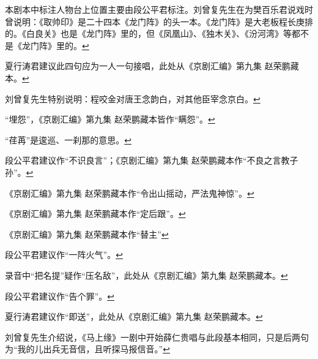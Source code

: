 \item
  \leavevmode\hypertarget{fn337}{}%
  本剧本中标注人物台上位置主要由段公平君标注。刘曾复先生在为樊百乐君说戏时曾说明：《取帅印》是二十四本《龙门阵》的头一本。《龙门阵》是大老板程长庚排的。《白良关》也是《龙门阵》里的，但《凤凰山》、《独木关》、《汾河湾》等都不是《龙门阵》里的。\protect\hyperlink{fnref337}{↩}
\item
  \leavevmode\hypertarget{fn338}{}%
  夏行涛君建议此四句应为一人一句接唱，此处从《京剧汇编》第九集
  赵荣鹏藏本。\protect\hyperlink{fnref338}{↩}
\item
  \leavevmode\hypertarget{fn339}{}%
  刘曾复先生特别说明：程咬金对唐王念韵白，对其他臣宰念京白。\protect\hyperlink{fnref339}{↩}
\item
  \leavevmode\hypertarget{fn340}{}%
  ``埋怨''，《京剧汇编》第九集
  赵荣鹏藏本皆作``瞒怨''。\protect\hyperlink{fnref340}{↩}
\item
  \leavevmode\hypertarget{fn341}{}%
  ``荏苒''是逡巡、一刹那的意思。\protect\hyperlink{fnref341}{↩}
\item
  \leavevmode\hypertarget{fn342}{}%
  段公平君建议作``不识良言''；《京剧汇编》第九集
  赵荣鹏藏本作``不良之言教子孙''。\protect\hyperlink{fnref342}{↩}
\item
  \leavevmode\hypertarget{fn343}{}%
  《京剧汇编》第九集
  赵荣鹏藏本作``令出山摇动，严法鬼神惊''。\protect\hyperlink{fnref343}{↩}
\item
  \leavevmode\hypertarget{fn344}{}%
  《京剧汇编》第九集
  赵荣鹏藏本作``定后跟''。\protect\hyperlink{fnref344}{↩}
\item
  \leavevmode\hypertarget{fn345}{}%
  《京剧汇编》第九集 赵荣鹏藏本作``替主''\protect\hyperlink{fnref345}{↩}
\item
  \leavevmode\hypertarget{fn346}{}%
  段公平君建议作``一阵火气''。\protect\hyperlink{fnref346}{↩}
\item
  \leavevmode\hypertarget{fn347}{}%
  录音中``把名提''疑作``压名敌''，此处从《京剧汇编》第九集
  赵荣鹏藏本。\protect\hyperlink{fnref347}{↩}
\item
  \leavevmode\hypertarget{fn348}{}%
  段公平君建议作``告个罪''。\protect\hyperlink{fnref348}{↩}
\item
  \leavevmode\hypertarget{fn349}{}%
  夏行涛君建议作``即送''，此处从《京剧汇编》第九集
  赵荣鹏藏本。\protect\hyperlink{fnref349}{↩}
\item
  \leavevmode\hypertarget{fn350}{}%
  刘曾复先生介绍说，《马上缘》一剧中开始薛仁贵唱与此段基本相同，只是后两句为``我的儿出兵无音信，且听探马报信音。''\protect\hyperlink{fnref350}{↩}

